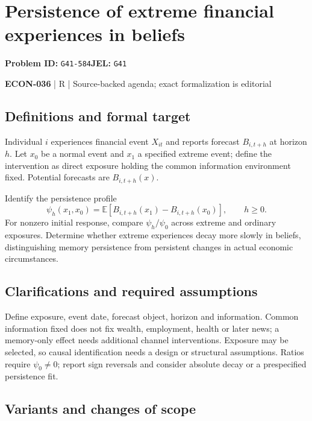 \documentclass[11pt,a4paper]{article}
\begin{document}
\section*{Persistence of extreme financial experiences in beliefs}
\textbf{Problem ID:} \texttt{G41-584}\quad \textbf{JEL:} \texttt{G41}\par
\label{problem:OP-0612}


\label{audited:ECON-036}

{\sffamily\small\color{muted}\textbf{ECON-036} | R | Source-backed agenda; exact formalization is editorial\par}

\subsection*{Definitions and formal target}

Individual $i$ experiences financial event $X_{it}$ and reports forecast $B_{i,t+h}$ at horizon $h$. Let $x_0$ be a normal event and $x_1$ a specified extreme event; define the intervention as direct exposure holding the common information environment fixed. Potential forecasts are $B_{i,t+h}(x)$.

Identify the persistence profile
\[
 \psi_h(x_1,x_0)=\mathbb E[B_{i,t+h}(x_1)-B_{i,t+h}(x_0)],\qquad h\geq0.
\]
For nonzero initial response, compare $\psi_h/\psi_0$ across extreme and ordinary exposures. Determine whether extreme experiences decay more slowly in beliefs, distinguishing memory persistence from persistent changes in actual economic circumstances.

\subsection*{Clarifications and required assumptions}

Define exposure, event date, forecast object, horizon and information. Common information fixed does not fix wealth, employment, health or later news; a memory-only effect needs additional channel interventions. Exposure may be selected, so causal identification needs a design or structural assumptions. Ratios require \(\psi_0\ne0\); report sign reversals and consider absolute decay or a prespecified persistence fit.

\subsection*{Variants and changes of scope}
\end{document}
